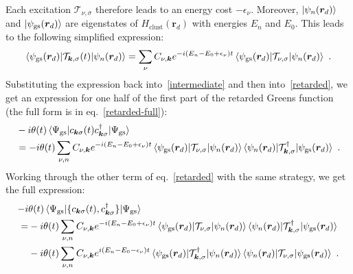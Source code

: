 Each excitation \(\mathcal{T}_{\nu,\sigma}\) therefore leads to an energy cost \(-\epsilon_\nu\). Moreover, \(\ket{\psi_n(\bm r_d)}\) and \(\ket{\psi_\text{gs}(\bm r_d)}\) are eigenstates of \(H_\text{clust}(\bm r_d)\) with energies \(E_n\) and \(E_0\). This leads to the following simplified expression:
\begin{equation}\begin{aligned}\label{intermediate2}
	\braket{\psi_\text{gs}({\bm r_d}) | \mathcal{T}_{{\bm k},\sigma}(t) | \psi_{n}({\bm r_d})} = \sum_{\nu}C_{\nu,\bm k}e^{-i(E_n - E_0 + \epsilon_\nu)t} \braket{\psi_\text{gs}({\bm r_d}) | \mathcal{T}_{{\nu},\sigma} | \psi_{n}({\bm r_d})}~.
\end{aligned}\end{equation}
Substituting the expression back into~\ref{intermediate} and then into~\ref{retarded}, we get an expression for one half of the first part of the retarded Greens function (the full form is in eq.~\ref{retarded-full}):
\begin{equation}\begin{aligned}
	&-i\theta(t) \braket{\Psi_\text{gs} | c_{{\bm k}\sigma}(t) c^\dagger_{{\bm k}\sigma} | \Psi_\text{gs}} \\
	&= -i\theta(t) \sum_{\nu, n} C_{\nu,\bm k} e^{-i(E_n - E_0 + \epsilon_\nu)t} \braket{\psi_\text{gs}({\bm r_d}) | \mathcal{T}_{{\nu},\sigma} | \psi_{n}({\bm r_d})}\braket{\psi_n({\bm r_d}) | \mathcal{T}_{\bm k,\sigma}^\dagger | \psi_\text{gs}({\bm r_d})}~.
\end{aligned}\end{equation}
Working through the other term of eq.~\ref{retarded} with the same strategy, we get the full expression:
\begin{equation}\begin{aligned}
	-i&\theta(t) \braket{\Psi_\text{gs} | \{c_{{\bm k}\sigma}(t), c^\dagger_{{\bm k}\sigma}\} | \Psi_\text{gs}} \\
	=& -i\theta(t) \sum_{\nu, n} C_{\nu,\bm k} e^{-i(E_n - E_0 + \epsilon_\nu)t} \braket{\psi_\text{gs}({\bm r_d}) | \mathcal{T}_{{\nu},\sigma} | \psi_{n}({\bm r_d})}\braket{\psi_n({\bm r_d}) | \mathcal{T}_{\bm k,\sigma}^\dagger | \psi_\text{gs}({\bm r_d})}\\
	 & -i\theta(t) \sum_{\nu, n} C_{\nu,\bm k} e^{i(E_n - E_0 - \epsilon_\nu)t} \braket{\psi_\text{gs}({\bm r_d}) | \mathcal{T}^\dagger_{{\bm k},\sigma} | \psi_{n}({\bm r_d})}\braket{\psi_n({\bm r_d}) | \mathcal{T}_{\nu,\sigma} | \psi_\text{gs}({\bm r_d})}~.
\end{aligned}\end{equation}
